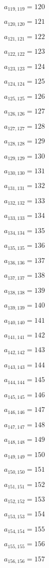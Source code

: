 \documentclass[a4paper,12pt]{article}
\begin{document}
$a _{ 119, 119 } = 120$

$a _{ 120, 120 } = 121$

$a _{ 121, 121 } = 122$

$a _{ 122, 122 } = 123$

$a _{ 123, 123 } = 124$

$a _{ 124, 124 } = 125$

$a _{ 125, 125 } = 126$

$a _{ 126, 126 } = 127$

$a _{ 127, 127 } = 128$

$a _{ 128, 128 } = 129$

$a _{ 129, 129 } = 130$

$a _{ 130, 130 } = 131$

$a _{ 131, 131 } = 132$

$a _{ 132, 132 } = 133$

$a _{ 133, 133 } = 134$

$a _{ 134, 134 } = 135$

$a _{ 135, 135 } = 136$

$a _{ 136, 136 } = 137$

$a _{ 137, 137 } = 138$

$a _{ 138, 138 } = 139$

$a _{ 139, 139 } = 140$

$a _{ 140, 140 } = 141$

$a _{ 141, 141 } = 142$

$a _{ 142, 142 } = 143$

$a _{ 143, 143 } = 144$

$a _{ 144, 144 } = 145$

$a _{ 145, 145 } = 146$

$a _{ 146, 146 } = 147$

$a _{ 147, 147 } = 148$

$a _{ 148, 148 } = 149$

$a _{ 149, 149 } = 150$

$a _{ 150, 150 } = 151$

$a _{ 151, 151 } = 152$

$a _{ 152, 152 } = 153$

$a _{ 153, 153 } = 154$

$a _{ 154, 154 } = 155$

$a _{ 155, 155 } = 156$

$a _{ 156, 156 } = 157$
\end{document}
